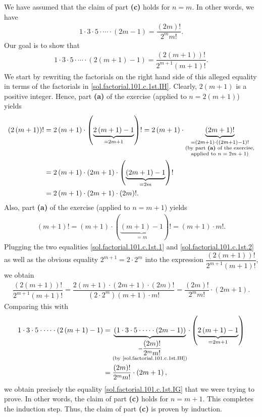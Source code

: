 \documentclass[paper=a4, fontsize=12pt]{scrartcl} %
\newcommand{\tup}[1]{\left( #1 \right)}
\newcommand{\underbrack}[2]{\underbrace{#1}_{\substack{#2}}}
\theoremstyle{plainsl}
\theoremstyle{definition}
\theoremstyle{remark}
\begin{document}
We have assumed that the claim of part \textbf{(c)} holds for $n = m$.
In other words, we have
\begin{align}
1\cdot 3\cdot 5\cdot \cdots \cdot \tup{2m - 1}
= \dfrac{\tup{2m}!}{2^m m!}.
\label{sol.factorial.101.c.1st.IH}
\end{align}
Our goal is to show that
\begin{align}
1\cdot 3\cdot 5\cdot \cdots \cdot \tup{2\tup{m+1} - 1}
= \dfrac{\tup{2\tup{m+1}}!}{2^{m+1} \tup{m+1}!}.
\label{sol.factorial.101.c.1st.IG}
\end{align}
We start by rewriting the factorials on the right hand side of this alleged
equality in terms of the factorials in \eqref{sol.factorial.101.c.1st.IH}.
Clearly, $2\tup{m+1}$ is a positive integer.
Hence, part \textbf{(a)} of the exercise (applied to
$n = 2\tup{m+1}$) yields
\begin{align}
\tup{2\tup{m+1}}! 
& = 2\tup{m+1} \cdot \tup{ \underbrack{2\tup{m+1}-1}{= 2m+1} }!
  = 2\tup{m+1} \cdot \underbrack{\tup{2m + 1}!}{= \tup{2m + 1} \cdot
        \tup{ \tup{2m + 1} - 1 }! \\
        \text{(by part \textbf{(a)} of the exercise,} \\
        \text{applied to $n = 2m + 1$)}} \nonumber \\
& = 2\tup{m+1} \cdot \tup{2m + 1} \cdot
        \tup{ \underbrack{\tup{2m + 1} - 1}{= 2m} }!
    \nonumber \\
& = 2\tup{m+1} \cdot \tup{2m + 1} \cdot \tup{2m}! .
\label{sol.factorial.101.c.1st.1}
\end{align}
Also, part \textbf{(a)} of the exercise (applied to $n = m+1$) yields
\begin{align}
\tup{m + 1}!
= \tup{m+1} \cdot \tup{ \underbrack{\tup{m+1}-1}{= m} } !
= \tup{m+1} \cdot m! .
\label{sol.factorial.101.c.1st.2}
\end{align}
Plugging the two equalities \eqref{sol.factorial.101.c.1st.1}
and \eqref{sol.factorial.101.c.1st.2} as well as the obvious
equality $2^{m+1} = 2 \cdot 2^m$ into the
expression $\dfrac{\tup{2\tup{m+1}}!}{2^{m+1} \tup{m+1}!}$, we
obtain
\begin{align*}
\dfrac{\tup{2\tup{m+1}}!}{2^{m+1} \tup{m+1}!}
=
\dfrac{2\tup{m+1} \cdot \tup{2m + 1} \cdot \tup{2m}!}
      { \tup{2 \cdot 2^m} \tup{m+1} \cdot m!}
= \dfrac{\tup{2m} !}{2^m m!}\cdot \tup{2m + 1} .
\end{align*}
Comparing this with
\begin{align*}
  1\cdot 3\cdot 5\cdot \cdots \cdot \tup{2\tup{m+1} - 1}
& = \underbrack{\tup{ 1\cdot 3\cdot 5\cdot \cdots \cdot \tup{2m - 1} }}
        {= \dfrac{\tup{2m}!}{2^m m!} \\
           \text{(by \eqref{sol.factorial.101.c.1st.IH})}}
    \cdot \tup{ \underbrack{2\tup{m+1} - 1}{= 2m + 1} } \\
& = \dfrac{\tup{2m}!}{2^m m!} \cdot \tup{2m + 1} ,
\end{align*}
we obtain precisely the equality \eqref{sol.factorial.101.c.1st.IG} that we
were trying to prove.
In other words, the claim of part \textbf{(c)} holds for $n = m+1$.
This completes the induction step.
Thus, the claim of part \textbf{(c)} is proven by induction.
\end{document}
